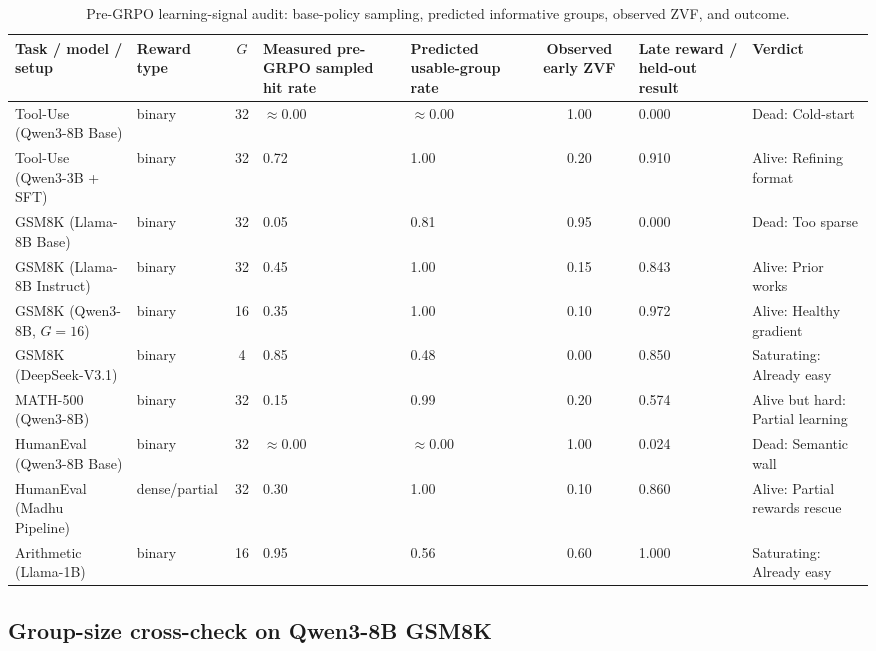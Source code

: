 \documentclass[12pt,a4paper]{report}
\begin{document}
\begin{table}[ht]
\centering
\caption{Pre-GRPO learning-signal audit: base-policy sampling, predicted informative groups, observed ZVF, and outcome.}
\label{tab:hit-rate-keystone}
\footnotesize
\setlength{\tabcolsep}{3pt}
\footnotesize
\begin{tabularx}{\textwidth}{@{}p{} p{} c p{} p{} c p{} X@{}}
\toprule
Task / model / setup & Reward type & $G$ & Measured pre-GRPO sampled hit rate & Predicted usable-group rate & Observed early ZVF & Late reward / held-out result & Verdict \\
\midrule
Tool-Use (Qwen3-8B Base) & binary & 32 & $\approx 0.00$ & $\approx 0.00$ & 1.00 & 0.000 & Dead: Cold-start \\
Tool-Use (Qwen3-3B + SFT) & binary & 32 & 0.72 & 1.00 & 0.20 & 0.910 & Alive: Refining format \\
GSM8K (Llama-8B Base) & binary & 32 & 0.05 & 0.81 & 0.95 & 0.000 & Dead: Too sparse \\
GSM8K (Llama-8B Instruct) & binary & 32 & 0.45 & 1.00 & 0.15 & 0.843 & Alive: Prior works \\
GSM8K (Qwen3-8B, $G{=}16$) & binary & 16 & 0.35 & 1.00 & 0.10 & 0.972 & Alive: Healthy gradient \\
GSM8K (DeepSeek-V3.1) & binary & 4 & 0.85 & 0.48 & 0.00 & 0.850 & Saturating: Already easy \\
MATH-500 (Qwen3-8B) & binary & 32 & 0.15 & 0.99 & 0.20 & 0.574 & Alive but hard: Partial learning \\
HumanEval (Qwen3-8B Base) & binary & 32 & $\approx 0.00$ & $\approx 0.00$ & 1.00 & 0.024 & Dead: Semantic wall \\
HumanEval (Madhu Pipeline) & dense/partial & 32 & 0.30 & 1.00 & 0.10 & 0.860 & Alive: Partial rewards rescue \\
Arithmetic (Llama-1B) & binary & 16 & 0.95 & 0.56 & 0.60 & 1.000 & Saturating: Already easy \\
\bottomrule
\end{tabularx}
\end{table}

\subsection*{Group-size cross-check on Qwen3-8B GSM8K}
\end{document}
